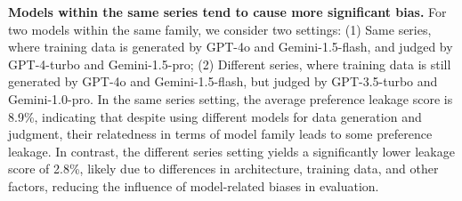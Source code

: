 \documentclass{article} %
\begin{document}
\begin{table}
\vspace{-20pt}
\caption{Preference leakage score in different relatedness between the data generator and the judging LLM.}
\vspace{5pt}
\centering
{}
\label{tab:relatedness}
\vspace{-10pt}
\end{table}

\textbf{Models within the same series tend to cause more significant bias.} For two models within the same family, we consider two settings: (1) Same series, where training data is generated by GPT-4o and Gemini-1.5-flash, and judged by GPT-4-turbo and Gemini-1.5-pro; (2) Different series, where training data is still generated by GPT-4o and Gemini-1.5-flash, but judged by GPT-3.5-turbo and Gemini-1.0-pro.
In the same series setting, the average preference leakage score is 8.9\%, indicating that despite using different models for data generation and judgment, their relatedness in terms of model family leads to some preference leakage. In contrast, the different series setting yields a significantly lower leakage score of 2.8\%, likely due to differences in architecture, training data, and other factors, reducing the influence of model-related biases in evaluation.
\end{document}
